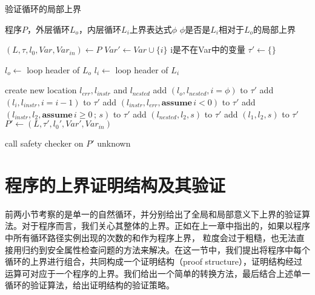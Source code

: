 \begin{algorithm}[ht]
  \caption{验证循环的局部上界}
  \label{alg:local-verif}
  \begin{algorithmic}
    \REQUIRE 程序$P$，外层循环$L_o$，内层循环$L_i$上界表达式$\phi$
    \ENSURE $\phi$是否是$L_i$相对于$L_o$的局部上界

    \STATE $(L, \tau, l_0, Var, Var_{in}) \leftarrow P$
    \STATE $Var' \leftarrow Var \cup \{i\}$ \COMMENT i是不在Var中的变量
    \STATE $\tau' \leftarrow \{\}$
    
    \STATE $l_o \leftarrow$ loop header of $L_o$
    \STATE $l_i \leftarrow$ loop header of $L_i$
    
    \STATE create new location $l_{err}, l_{instr}$ and $l_{nested}$
    \STATE add $(l_o, l_{nested}, i = \phi)$ to $\tau'$
    \STATE add $(l_i, l_{instr}, i = i - 1)$ to $\tau'$
    \STATE add $(l_{instr}, l_{err}, \mathbf{assume}\, i < 0)$ to $\tau'$
        \STATE add $(l_{instr}, l_2, \mathbf{assume}\, i \geq 0\, \mathbf{;}\, s)$ to $\tau'$
    \ENDFOR
        \STATE add $(l_{nested}, l_2, s)$ to $\tau'$
    \ENDFOR
        \STATE add $(l_1, l_2, s)$ to $\tau'$ 
    \ENDFOR
    \STATE $P' \leftarrow (L, \tau', l_0', Var', Var_{in})$
    
    \STATE call safety checker on $P'$ 
        \RETURN \TRUE
        \RETURN \FALSE
        \RETURN unknown
    \ENDIF

  \end{algorithmic}
\end{algorithm}

\section{程序的上界证明结构及其验证}

前两小节考察的是单一的自然循环，并分别给出了全局和局部意义下上界的验证算法。对于程序而言，我们关心其整体的上界。正如在上一章中指出的，如果以程序中所有循环路径实例出现的次数的和作为程序上界，
粒度会过于粗糙，也无法直接用归约到安全属性检查问题的方法来解决。在这一节中，我们提出将程序中每个循环的上界进行组合，共同构成一个证明结构（proof
structure\cite{gulwani_speed_2009}），证明结构经过运算可对应于一个程序的上界。我们给出一个简单的转换方法，最后结合上述单一循环的验证算法，给出证明结构的验证策略。

